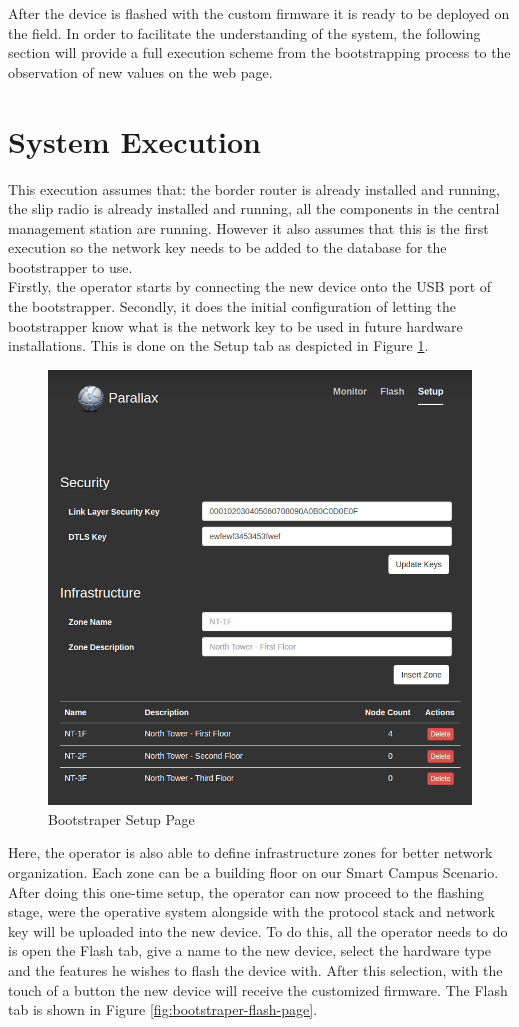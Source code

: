 After the device is flashed with the custom firmware it is ready to be deployed on the field. In order to facilitate the understanding of the system, the following section will provide a full execution scheme from the bootstrapping process to the observation of new values on the web page.

\section{System Execution}
\label{sec:system_execution}

This execution assumes that: the border router is already installed and running, the slip radio is already installed and running, all the components in the central management station are running. However it also assumes that this is the first execution so the network key needs to be added to the database for the bootstrapper to use.\\

Firstly, the operator starts by connecting the new device onto the USB port of the bootstrapper.
Secondly, it does the initial configuration of letting the bootstrapper know what is the network key to be used in future hardware installations. This is done on the Setup tab as despicted in Figure \ref{fig:bootstraper-setup-page}.

\begin{figure}[h]
  \centering
  \includegraphics[width=0.7\linewidth]{figures/parallax_setup.png}
  \caption{Bootstraper Setup Page}
  \label{fig:bootstraper-setup-page}
\end{figure}

Here, the operator is also able to define infrastructure zones for better network organization. Each zone can be a building floor on our Smart Campus Scenario.\\
After doing this one-time setup, the operator can now proceed to the flashing stage, were the operative system alongside with the protocol stack and network key will be uploaded into the new device. To do this, all the operator needs to do is open the Flash tab, give a name to the new device, select the hardware type and the features he wishes to flash the device with. After this selection, with the touch of a button the new device will receive the customized firmware. The Flash tab is shown in Figure \ref{fig:bootstraper-flash-page}.

